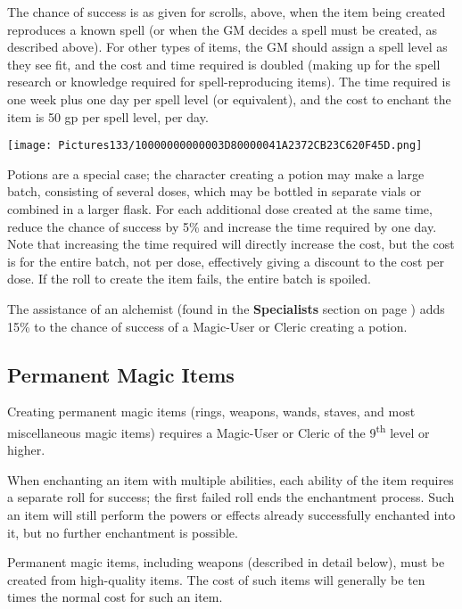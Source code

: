 \documentclass[a4paper,twoside,openany,10pt]{book}
\begin{document}
\begin{multicols}{2}
The chance of success is as given for scrolls, above, when the item being created reproduces a known spell (or when the GM decides a spell must be created, as described above). For other types of items, the GM should assign a spell level as they see fit, and the cost and time required is doubled (making up for the spell research or knowledge required for spell-reproducing items). The time required is one week plus one day per spell level (or equivalent), and the cost to enchant the item is 50 gp per spell level, per day.

\begin{center}
	\texttt{[image: Pictures133/10000000000003D80000041A2372CB23C620F45D.png]}
\end{center}

Potions are a special case; the character creating a potion may make a large batch, consisting of several doses, which may be bottled in separate vials or combined in a larger flask. For each additional dose created at the same time, reduce the chance of success by 5\% and increase the time required by one day. Note that increasing the time required will directly increase the cost, but the cost is for the entire batch, not per dose, effectively giving a discount to the cost per dose. If the roll to create the item fails, the entire batch is spoiled.

The assistance of an alchemist (found in the \textbf{Specialists} section on page \hyperlink{Alchemistux20Entry}{\pageref{Alchemistux20Entry}}) adds 15\% to the chance of success of a Magic-User or Cleric creating a potion.

\subsection{Permanent Magic Items}\label{permanent-magic-items}

Creating permanent magic items (rings, weapons, wands, staves, and most miscellaneous magic items) requires a Magic-User or Cleric of the 9\textsuperscript{th} level or higher.

When enchanting an item with multiple abilities, each ability of the item requires a separate roll for success; the first failed roll ends the enchantment process. Such an item will still perform the powers or effects already successfully enchanted into it, but no further enchantment is possible.

Permanent magic items, including weapons (described in detail below), must be created from high-quality items. The cost of such items will generally be ten times the normal cost for such an item.


\end{multicols}
\end{document}
